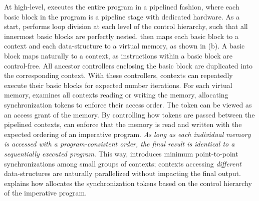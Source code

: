 At high-level, \name executes the entire program in a pipelined fashion, where each basic block
in the program is a pipeline stage with dedicated hardware.
As a start, \name performs loop division at each level of the control hierarchy, such that all
innermost basic blocks are perfectly nested. \name then maps each basic block to a context and each
data-structure to a virtual memory, as shown in  (b).
A basic block maps naturally to a context, as instructions within a basic block are control-free. 
All ancestor controllers enclosing the basic block are duplicated into the corresponding context.
With these controllers, contexts can repeatedly execute their basic blocks for expected number iterations. 
For each virtual memory, \name examines all contexts reading or writing the memory,
allocating synchronization tokens to enforce their access order.
The token can be viewed as an access grant of the memory.
By controlling how tokens are passed between the pipelined contexts, \name can enforce that the memory is read and written with the expected ordering of an imperative program.
\emph{As long as each individual memory is accessed with a program-consistent
order, the final result is identical to a sequentially executed program}.
This way, \name introduces minimum point-to-point synchronizations among small groups of contexts; contexts
accessing \emph{different} data-structures are naturally parallelized without impacting the final output.
 explains how \name allocates the synchronization tokens based on the control
hierarchy of the imperative program.

